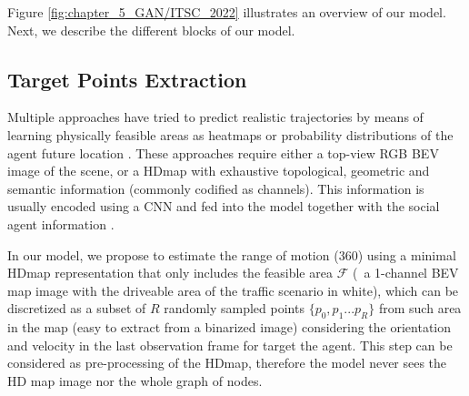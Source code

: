 Figure \ref{fig:chapter_5_GAN/ITSC_2022} illustrates an overview of our model. Next, we describe the different blocks of our model.

\subsection{Target Points Extraction}
\label{subsec:5_target_points_extraction}

Multiple approaches have tried to predict realistic trajectories by means of learning physically feasible areas as heatmaps or probability distributions of the agent future location \cite{dendorfer2020goal, sadeghian2019sophie, gilles2021home}. These approaches require either a top-view RGB \ac{BEV} image of the scene, or a \ac{HDmap} with exhaustive topological, geometric and semantic information (commonly codified as channels). This information is usually encoded using a \ac{CNN} and fed into the model together with the social agent information \cite{dendorfer2020goal, sadeghian2019sophie, gao2020vectornet}.

In our model, we propose to estimate the range of motion (360\degree) using a minimal \ac{HDmap} representation that only includes the feasible area $\mathcal{F}$ (\ie \ a 1-channel \ac{BEV} map image with the driveable area of the traffic scenario in white), which can be discretized as a subset of $R$ randomly sampled points $\{p_0 , p_1 ... p_R\}$ from such area in the map (easy to extract from a binarized image) considering the orientation and velocity in the last observation frame for target the agent. This step can be considered as pre-processing of the \ac{HDmap}, therefore the model never sees the HD map image nor the whole graph of nodes. 


